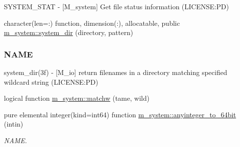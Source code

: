 \begin{DoxyCompactItemize}
\begin{DoxyCompactList}
S\+Y\+S\+T\+E\+M\+\_\+\+S\+T\+AT -\/ \mbox{[}M\+\_\+system\mbox{]} Get file status information (L\+I\+C\+E\+N\+SE\+:PD) \end{DoxyCompactList}\item 
character(len=\+:) function, dimension(\+:), allocatable, public \mbox{\hyperlink{namespacem__system_a744f46033ef5e7ae95ec6cbff3ae3f89}{m\+\_\+system\+::system\+\_\+dir}} (directory, pattern)
\begin{DoxyCompactList}\small\item\em \subsubsection*{N\+A\+ME}

system\+\_\+dir(3f) -\/ \mbox{[}M\+\_\+io\mbox{]} return filenames in a directory matching specified wildcard string (L\+I\+C\+E\+N\+SE\+:PD) \end{DoxyCompactList}\item 
logical function \mbox{\hyperlink{namespacem__system_a0fccb69d0a56044b05e85b8df9f90aea}{m\+\_\+system\+::matchw}} (tame, wild)
\item 
pure elemental integer(kind=int64) function \mbox{\hyperlink{namespacem__system_a151da54be39dddcf270cceeff3243438}{m\+\_\+system\+::anyinteger\+\_\+to\+\_\+64bit}} (intin)
\begin{DoxyCompactList}\small\item\em N\+A\+ME. \end{DoxyCompactList}\end{DoxyCompactItemize}
